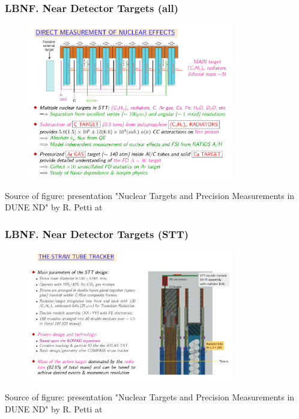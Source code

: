 \begin{frame}\frametitle{LBNF. Near Detector Targets (all)}
\begin{figure}
\centering
\includegraphics[width=0.80\textwidth, keepaspectratio=true]{figs/nearDetector_targets01.png}
\end{figure}
\tiny
Source of figure: presentation "Nuclear Targets and Precision Measurements in DUNE ND" by R. Petti at \cite{ref_LBNF_collaborationMeeting}
\end{frame}

\begin{frame}\frametitle{LBNF. Near Detector Targets (STT)}
\begin{figure}
\centering
\includegraphics[width=0.80\textwidth, keepaspectratio=true]{figs/nearDetector_targets02.png}
\end{figure}
\tiny
Source of figure: presentation "Nuclear Targets and Precision Measurements in DUNE ND" by R. Petti at \cite{ref_LBNF_collaborationMeeting}
\end{frame}

